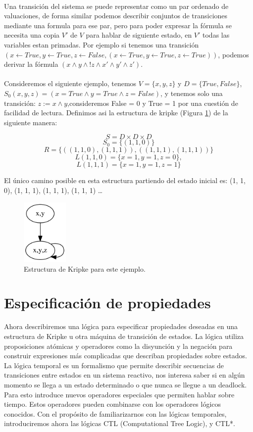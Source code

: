 \\
Una transición del sistema se puede representar como un par ordenado de valuaciones, de forma similar podemos describir conjuntos de transiciones mediante una formula para ese par, pero para poder expresar la fórmula se necesita una copia $V'$ de $V$ para hablar de siguiente estado, en $V'$ todas las variables estan primadas. Por ejemplo si tenemos una transición $(x \gets True, y \gets True, z \gets False,(x \gets True, y \gets True, z \gets True))$, podemos derivar la fórmula $(x \land y \land !z \land x' \land y' \land z')$.\\
\\
Consideremos el siguiente ejemplo, tenemos $V = \{x,y,z\}$ y $D = \{True, False\}$, $S_{0} (x,y,z) = (x= True \land y = True \land z = False)$, y tenemos solo una transición: $z := x \land y$,consideremos False = 0 y True = 1 por una cuestión de facilidad de lectura. Definimos asi la estructura de kripke (Figura \ref{fig:kripke1})  de la siguiente manera:

\[S = D \times D \times D\]
\[S_{0} = \{(1, 1, 0)\}\]
\[R = \{((1, 1, 0), (1, 1, 1)), ((1, 1, 1), (1, 1, 1))\}\]
\[L (1, 1, 0) = \{x = 1, y = 1, z = 0\},\]
\[L (1, 1, 1) = \{x = 1, y = 1, z = 1\}\]

El único camino posible en esta estructura partiendo del estado inicial es: (1, 1, 0), (1, 1, 1), (1, 1, 1), (1, 1, 1) …

\begin{figure}[h!]
  \centering
  \includegraphics[width=0.2\textwidth]{Figures/kripke.png}
  \caption{Estructura de Kripke para este ejemplo.}
  \label{fig:kripke1}
\end{figure}

\section{Especificación de propiedades}

Ahora describiremos una lógica para especificar propiedades deseadas en una estructura de Kripke u otra máquina de transición de estados. La lógica utiliza proposiciones atómicas y operadores como la disyunción y la negación para construir expresiones más complicadas que describan propiedades sobre estados.
La lógica temporal es un formalismo que permite describir secuencias de transiciones entre estados en un sistema reactivo, nos interesa saber si en algún momento se llega a un estado determinado o que nunca se llegue a un deadlock. Para esto introduce nuevos operadores especiales que permiten hablar sobre tiempo. Estos operadores pueden combinarse con los operadores lógicos conocidos.
Con el propósito de familiarizarnos con las lógicas temporales, introduciremos ahora las lógicas CTL (Computational Tree Logic), y CTL*. 

